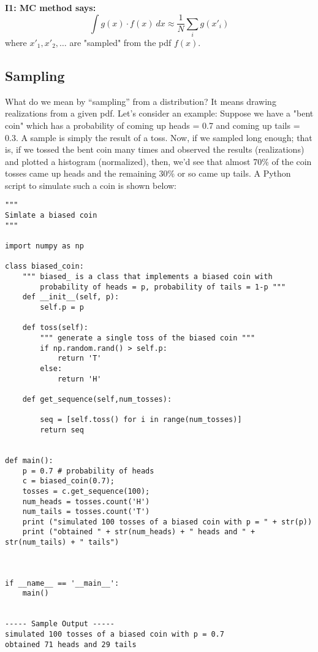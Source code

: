 \documentclass[11pt,onecolumn]{article}
\begin{document}
{\bf I1: MC method says:}
\[
\int g(x) \cdot f(x) ~ dx \approx \frac{1}{N} \sum_i g(x'_i)
\]
where $x'_1, x'_2,\dots$ are "sampled" from the pdf $f(x)$.

\subsection{Sampling}
What do we mean by ``sampling'' from a distribution? It means drawing realizations from a given pdf. Let's consider an example:
Suppose we have a "bent coin" which has a probability of coming up heads = 0.7 and coming up tails = 0.3. A sample is simply the result of a toss. Now, if we sampled long enough; that is, if we tossed the bent coin many times and observed the results (realizations) and plotted a histogram (normalized), then, we'd see that almost 70\% of the coin tosses came up heads and the remaining 30\% or so came up tails. A Python script to simulate such a coin is shown below:

\begin{verbatim}
"""
Simlate a biased coin
"""

import numpy as np

class biased_coin:
    """ biased_ is a class that implements a biased coin with
        probability of heads = p, probability of tails = 1-p """
    def __init__(self, p):
        self.p = p
      
    def toss(self):
        """ generate a single toss of the biased coin """  
        if np.random.rand() > self.p:
            return 'T'
        else:
            return 'H'

    def get_sequence(self,num_tosses):
        
        seq = [self.toss() for i in range(num_tosses)]
        return seq
        
        
def main():
    p = 0.7 # probability of heads
    c = biased_coin(0.7);
    tosses = c.get_sequence(100);
    num_heads = tosses.count('H')
    num_tails = tosses.count('T')
    print ("simulated 100 tosses of a biased coin with p = " + str(p))
    print ("obtained " + str(num_heads) + " heads and " + str(num_tails) + " tails")



if __name__ == '__main__':
    main()
    
    
----- Sample Output -----
simulated 100 tosses of a biased coin with p = 0.7
obtained 71 heads and 29 tails

\end{verbatim}
\end{document}
